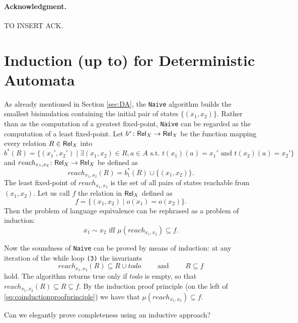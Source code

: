 \documentclass{llncs}
\begin{document}
\paragraph{Acknowledgment.} TO INSERT ACK.



\clearpage
\appendix
%
%

\section{Induction (up to) for Deterministic Automata}
%
As already mentioned in Section \ref{sec:DA}, the \texttt{Naive} algorithm builds the smallest bisimulation containing the initial pair of states $\{(x_1,x_2)\}$. Rather than as the computation of a greatest fixed-point, \texttt{Naive} can be regarded as the computation of a least fixed-point.
Let $b^*\colon \mathsf{Rel}_X \to \mathsf{Rel}_X$ be the function mapping every relation $R\in \mathsf{Rel}_X$ into
\begin{equation}\label{eq:bstarDA}
b^*(R) = \{(x_1',x_2') \mid \exists (x_1,x_2)\in R, a\in A \text{ s.t. }  t(x_1)(a)=x_1' \text{ and } t(x_2)(a)=x_2' \}
\end{equation}
and $reach_{x_1,x_2}\colon \mathsf{Rel}_X \to \mathsf{Rel}_X$ be defined as 
$$reach_{x_1,x_2}(R) = b_1^*(R) \cup \{(x_1,x_2)\}\text{.}$$
The least fixed-point of $reach_{x_1,x_2}$ is the set of all pairs of states reachable from $(x_1,x_2)$.
Let us call $f$ the relation in $\mathsf{Rel}_X$ defined as 
\begin{equation}\label{eq:fDA}
f=\{(x_1,x_2)  \mid o(x_1)=o(x_2) \}\text{.}
\end{equation}
Then the problem of language equivalence can be rephrased as a problem of induction:
$$x_1\sim x_2 \text{ iff } \mu (reach_{x_1,x_2}) \subseteq f\text{.}$$

Now the soundness of \texttt{Naive} can be proved by means of induction: at any iteration of the while loop \texttt{(3)} the invariants
$$reach_{x_1,x_2}(R) \subseteq R\cup todo \qquad \text{ and } \qquad R\subseteq f$$
hold. The algorithm returns true only if $todo$ is empty, so that $reach_{x_1,x_2}(R) \subseteq R \subseteq f$. By the induction proof principle (on the left of \eqref{eq:coinductionproofprinciple}) we have that  $\mu (reach_{x_1,x_2}) \subseteq f$.
\begin{question} 
Can we elegantly prove completeness using an inductive approach?
\end{question}
\end{document}

